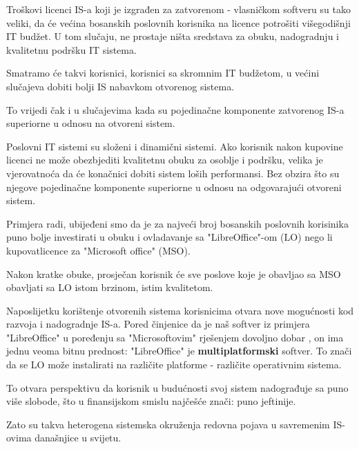 \documentclass[times, utf8, seminar]{fit}
\begin{document}
Troškovi licenci IS-a koji je izgrađen za zatvorenom - vlasničkom softveru  su tako veliki, da će većina bosanskih poslovnih korisnika na licence potrošiti višegodišnji IT budžet. U tom slučaju, ne prostaje ništa sredstava za obuku, nadogradnju i kvalitetnu podršku IT sistema.

Smatramo će takvi korisnici, korisnici sa skromnim IT budžetom, u većini slučajeva dobiti bolji IS nabavkom otvorenog sistema.

To vrijedi čak i u slučajevima kada su pojedinačne komponente zatvorenog IS-a superiorne u odnosu na otvoreni sistem.

Poslovni IT sistemi su složeni i dinamični sistemi. Ako korisnik nakon kupovine licenci ne može obezbjediti kvalitetnu obuku za osoblje i podršku, velika je vjerovatnoća da će konačnici dobiti sistem loših performansi. Bez obzira što su njegove pojedinačne komponente superiorne u odnosu na odgovarajući otvoreni sistem.

Primjera radi, ubijeđeni smo da je za najveći broj bosanskih poslovnih korisinika puno bolje investirati u obuku i ovladavanje sa "LibreOffice"-om (LO) nego li kupovatlicence za "Microsoft office" (MSO). 

Nakon kratke obuke, prosječan korisnik će sve poslove koje je obavljao sa MSO obavljati sa LO istom brzinom, istim kvalitetom.

Naposlijetku korištenje otvorenih sistema korisnicima otvara nove mogućnosti kod razvoja i nadogradnje IS-a. 
Pored činjenice da je naš softver iz primjera "LibreOffice" u poređenju sa "Microsoftovim" rješenjem dovoljno dobar , on ima jednu veoma bitnu prednost: "LibreOffice" je \textbf{multiplatformski} softver. To znači da se LO može instalirati na različite platforme - različite operativnim sistema.

To otvara perspektivu da korisnik u budućnosti svoj sistem nadograđuje sa puno više slobode, što u finansijskom smislu najčešće znači: puno jeftinije.  

Zato su takva heterogena sistemska okruženja redovna pojava u savremenim IS-ovima današnjice u svijetu.  




\appendix
\end{document}
